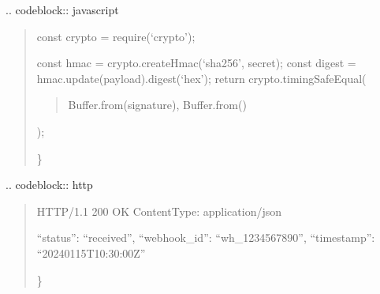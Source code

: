 \documentclass[letterpaper,10pt,english]{sphinxmanual}
\begin{document}
\sphinxAtStartPar
{}
.. code\sphinxhyphen{}block:: javascript
\begin{quote}

\sphinxAtStartPar
const crypto = require(‘crypto’);
\begin{description}
\sphinxAtStartPar
const hmac = crypto.createHmac(‘sha256’, secret);
const digest = hmac.update(payload).digest(‘hex’);
return crypto.timingSafeEqual(
\begin{quote}

\sphinxAtStartPar
Buffer.from(signature),
Buffer.from()
\end{quote}

\sphinxAtStartPar
);

\end{description}

\sphinxAtStartPar
\}
\end{quote}

\sphinxAtStartPar
{}
.. code\sphinxhyphen{}block:: http
\begin{quote}

\sphinxAtStartPar
HTTP/1.1 200 OK
Content\sphinxhyphen{}Type: application/json
\begin{description}
\sphinxlineitem{\{}
\sphinxAtStartPar
“status”: “received”,
“webhook\_id”: “wh\_1234567890”,
“timestamp”: “2024\sphinxhyphen{}01\sphinxhyphen{}15T10:30:00Z”

\end{description}

\sphinxAtStartPar
\}
\end{quote}
\end{document}
